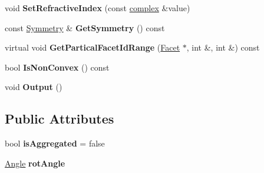 \begin{DoxyCompactItemize}
\item 
\mbox{\label{class_particle_a9345bfffdb91b7beb9ec48c9af29141e}} 
void {\bfseries Set\+Refractive\+Index} (const \mbox{\hyperlink{classcomplex}{complex}} \&value)
\item 
\mbox{\label{class_particle_a29fe705a8c842ab5e31ccb94cf36fe88}} 
const \mbox{\hyperlink{class_orientation}{Symmetry}} \& {\bfseries Get\+Symmetry} () const
\item 
\mbox{\label{class_particle_a9e5414148dbe4bdcee8a96b9db7d1b6e}} 
virtual void {\bfseries Get\+Partical\+Facet\+Id\+Range} (\mbox{\hyperlink{class_facet}{Facet}} $\ast$, int \&, int \&) const
\item 
\mbox{\label{class_particle_a7bc2c366cbceb9fcae17d4cf8a318a73}} 
bool {\bfseries Is\+Non\+Convex} () const
\item 
\mbox{\label{class_particle_aa93506becba0fc23f34c8da36c2b846b}} 
void {\bfseries Output} ()
\end{DoxyCompactItemize}
\subsection*{Public Attributes}
\begin{DoxyCompactItemize}
\item 
\mbox{\label{class_particle_a57ad5c8ac7c6a4af8546210c5b4b2439}} 
bool {\bfseries is\+Aggregated} = false
\item 
\mbox{\label{class_particle_a0be211b0c7c5a3148ed7bde2d15da36d}} 
\mbox{\hyperlink{class_angle}{Angle}} {\bfseries rot\+Angle}
\end{DoxyCompactItemize}
